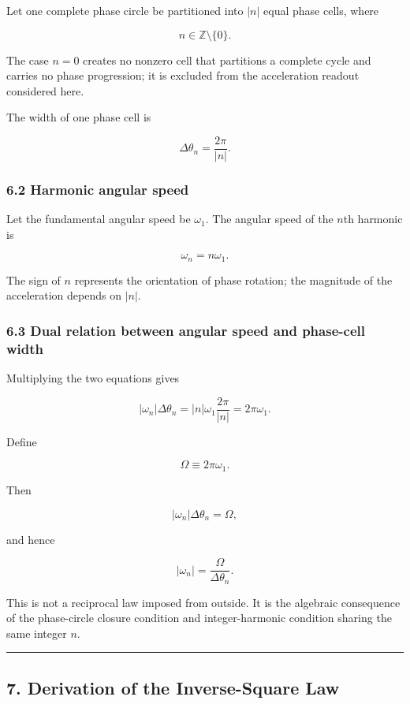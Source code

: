 \documentclass[
  a4paper,
]{article}
\begin{document}
Let one complete phase circle be partitioned into \(|n|\) equal phase
cells, where

\[
n\in\mathbb Z\setminus\{0\}.
\]

The case \(n=0\) creates no nonzero cell that partitions a complete
cycle and carries no phase progression; it is excluded from the
acceleration readout considered here.

The width of one phase cell is

\[
\boxed{
\Delta\theta_n
=\frac{2\pi}{|n|}
}.
\]

\subsubsection{6.2 Harmonic angular speed}\label{harmonic-angular-speed}

Let the fundamental angular speed be \(\omega_1\). The angular speed of
the \(n\)th harmonic is

\[
\boxed{
\omega_n=n\omega_1
}.
\]

The sign of \(n\) represents the orientation of phase rotation; the
magnitude of the acceleration depends on \(|n|\).

\subsubsection{6.3 Dual relation between angular speed and phase-cell
width}\label{dual-relation-between-angular-speed-and-phase-cell-width}

Multiplying the two equations gives

\[
|\omega_n|\Delta\theta_n
=|n|\omega_1\frac{2\pi}{|n|}
=2\pi\omega_1.
\]

Define

\[
\Omega\equiv2\pi\omega_1.
\]

Then

\[
\boxed{
|\omega_n|\Delta\theta_n=\Omega
},
\]

and hence

\[
\boxed{
|\omega_n|
=\frac{\Omega}{\Delta\theta_n}
}.
\]

This is not a reciprocal law imposed from outside. It is the algebraic
consequence of the phase-circle closure condition and integer-harmonic
condition sharing the same integer \(n\).

\begin{center}\rule{0.5\linewidth}{0.5pt}\end{center}

\subsection{7. Derivation of the Inverse-Square
Law}\label{derivation-of-the-inverse-square-law}
\end{document}
